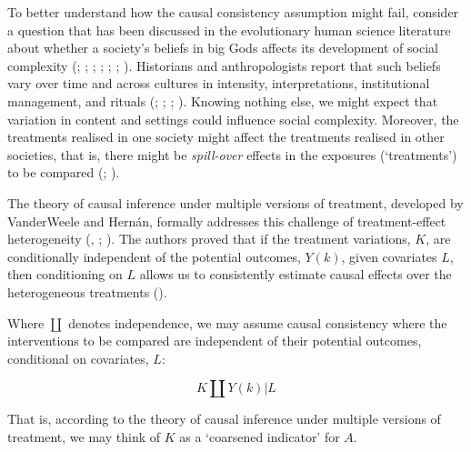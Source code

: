 \documentclass[
  singlecolumn]{article}
\begin{document}
To better understand how the causal consistency assumption might fail,
consider a question that has been discussed in the evolutionary human
science literature about whether a society's beliefs in big Gods affects
its development of social complexity (; ;
;
;
;
;
).
Historians and anthropologists report that such beliefs vary over time
and across cultures in intensity, interpretations, institutional
management, and rituals (; ;
;
). Knowing nothing else, we
might expect that variation in content and settings could influence
social complexity. Moreover, the treatments realised in one society
might affect the treatments realised in other societies, that is, there
might be \emph{spill-over} effects in the exposures (`treatments') to be
compared (;
).

The theory of causal inference under multiple versions of treatment,
developed by VanderWeele and Hernán, formally addresses this challenge
of treatment-effect heterogeneity
(,
;
). The
authors proved that if the treatment variations, \(K\), are
conditionally independent of the potential outcomes, \(Y(k)\), given
covariates \(L\), then conditioning on \(L\) allows us to consistently
estimate causal effects over the heterogeneous treatments
().

Where \(\coprod\) denotes independence, we may assume causal consistency
where the interventions to be compared are independent of their
potential outcomes, conditional on covariates, \(L\):

\[
K \coprod Y(k) | L
\]

That is, according to the theory of causal inference under multiple
versions of treatment, we may think of \(K\) as a `coarsened indicator'
for \(A\).
\end{document}
